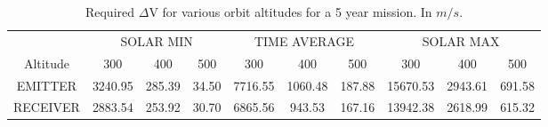\begin{table}
\centering
\begin{tabular}{ c | c | c | c | c | c | c | c | c | c }
& \multicolumn{3}{|c|}{SOLAR MIN}&\multicolumn{3}{|c|}{TIME AVERAGE}&\multicolumn{3}{|c}{SOLAR MAX} \\ \cline{2-10}
Altitude & 300 & 400 & 500 & 300 & 400 & 500 & 300 & 400 & 500 \\ \hline \hline
EMITTER & 3240.95 & 285.39 & 34.50 & 7716.55 & 1060.48 & 187.88 & 15670.53 & 2943.61 & 691.58 \\
RECEIVER& 2883.54 & 253.92 & 30.70 & 6865.56 & 943.53 & 167.16 & 13942.38 & 2618.99 & 615.32 \\
\end{tabular}
\caption{Required $\Delta$V for various orbit altitudes for a 5 year mission. In $m/s$.}
\label{table:deltaVTable}
\end{table}
